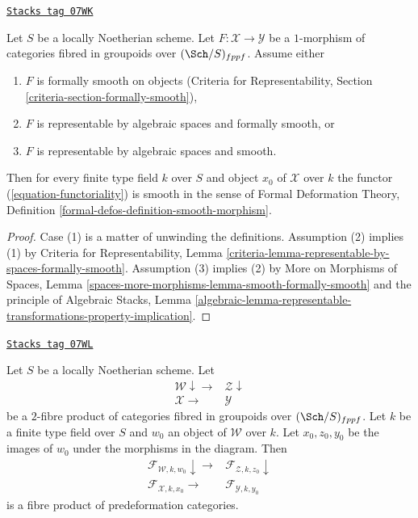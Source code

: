 \begin{lemma}
\label{artin-lemma-formally-smooth-on-deformation-categories}
\href{https://stacks.math.columbia.edu/tag/07WK}{\texttt{Stacks tag 07WK}}

Let $S$ be a locally Noetherian scheme. Let $F : \mathcal{X} \to \mathcal{Y}$
be a $1$-morphism of categories fibred in groupoids over $(\Sch/S)_{fppf}$.
Assume either
\begin{enumerate}
\item $F$ is formally smooth on objects (Criteria for Representability,
Section \ref{criteria-section-formally-smooth}),
\item $F$ is representable by algebraic spaces and formally smooth, or
\item $F$ is representable by algebraic spaces and smooth.
\end{enumerate}
Then for every finite type field $k$ over $S$ and object
$x_0$ of $\mathcal{X}$ over $k$ the functor (\ref{equation-functoriality})
is smooth in the sense of
Formal Deformation Theory, Definition
\ref{formal-defos-definition-smooth-morphism}.
\end{lemma}

\begin{proof}
Case (1) is a matter of unwinding the definitions.
Assumption (2) implies (1) by
Criteria for Representability, Lemma
\ref{criteria-lemma-representable-by-spaces-formally-smooth}.
Assumption (3) implies (2) by
More on Morphisms of Spaces, Lemma
\ref{spaces-more-morphisms-lemma-smooth-formally-smooth}
and the principle of
Algebraic Stacks, Lemma
\ref{algebraic-lemma-representable-transformations-property-implication}.
\end{proof}

\begin{lemma}
\label{artin-lemma-fibre-product-deformation-categories}
\href{https://stacks.math.columbia.edu/tag/07WL}{\texttt{Stacks tag 07WL}}

Let $S$ be a locally Noetherian scheme. Let
$$
\begin{array}{cc}\mathcal{W} \downarrow\longrightarrow & \mathcal{Z} \downarrow \\ \mathcal{X} \longrightarrow & \mathcal{Y}\end{array}
$$
be a $2$-fibre product of categories fibred in groupoids over
$(\Sch/S)_{fppf}$. Let $k$ be a finite type field over $S$ and
$w_0$ an object of $\mathcal{W}$ over $k$. Let $x_0, z_0, y_0$ be
the images of $w_0$ under the morphisms in the diagram. Then
$$
\begin{array}{cc}\mathcal{F}_{\mathcal{W}, k, w_0} \downarrow\longrightarrow & \mathcal{F}_{\mathcal{Z}, k, z_0} \downarrow \\ \mathcal{F}_{\mathcal{X}, k, x_0} \longrightarrow & \mathcal{F}_{\mathcal{Y}, k, y_0}\end{array}
$$
is a fibre product of predeformation categories.
\end{lemma}

